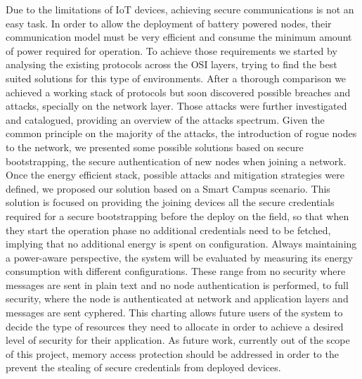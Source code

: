 Due to the limitations of \ac{IoT} devices, achieving secure communications is not an easy task. In order to allow the deployment of battery powered nodes, their communication model must be very efficient and consume the minimum amount of power required for operation. To achieve those requirements we started by analysing the existing protocols across the OSI layers, trying to find the best suited solutions for this type of environments. After a thorough comparison we achieved a working stack of protocols but soon discovered possible breaches and attacks, specially on the network layer. Those attacks were further investigated and catalogued, providing an overview of the attacks spectrum. Given the common principle on the majority of the attacks, the introduction of rogue nodes to the network, we presented some possible solutions based on secure bootstrapping, the secure authentication of new nodes when joining a network.
Once the energy efficient stack, possible attacks and mitigation strategies were defined, we proposed our solution based on a Smart Campus scenario. This solution is focused on providing the joining devices all the secure credentials required for a secure bootstrapping before the deploy on the field, so that when they start the operation phase no additional credentials need to be fetched, implying that no additional energy is spent on configuration.
Always maintaining a power-aware perspective, the system will be evaluated by measuring its energy consumption with different configurations. These range from no security where messages are sent in plain text and no node authentication is performed, to full security, where the node is authenticated at network and application layers and messages are sent cyphered. This charting allows future users of the system to decide the type of resources they need to allocate in order to achieve a desired level of security for their application. As future work, currently out of the scope of this project, memory access protection should be addressed in order to the prevent the stealing of secure credentials from deployed devices.
